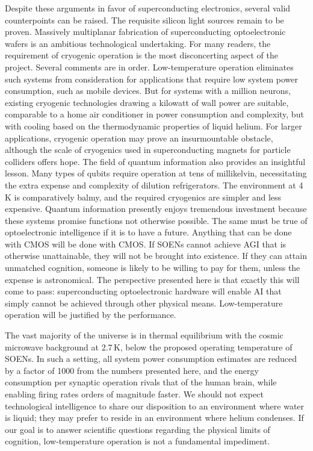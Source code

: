 \documentclass[twocolumn]{article}
\begin{document}
Despite these arguments in favor of superconducting electronics, several valid counterpoints can be raised. The requisite silicon light sources remain to be proven. Massively multiplanar fabrication of superconducting optoelectronic wafers is an ambitious technological undertaking. For many readers, the requirement of cryogenic operation is the most disconcerting aspect of the project. Several comments are in order. Low-temperature operation eliminates such systems from consideration for applications that require low system power consumption, such as mobile devices. But for systems with a million neurons, existing cryogenic technologies drawing a kilowatt of wall power are suitable, comparable to a home air conditioner in power consumption and complexity, but with cooling based on the thermodynamic properties of liquid helium. For larger applications, cryogenic operation may prove an insurmountable obstacle, although the scale of cryogenics used in superconducting magnets for particle colliders offers hope. The field of quantum information also provides an insightful lesson. Many types of qubits require operation at tens of millikelvin, necessitating the extra expense and complexity of dilution refrigerators. The environment at 4\,K is comparatively balmy, and the required cryogenics are simpler and less expensive. Quantum information presently enjoys tremendous investment because these systems promise functions not otherwise possible. The same must be true of optoelectronic intelligence if it is to have a future. Anything that can be done with CMOS will be done with CMOS. If SOENs cannot achieve AGI that is otherwise unattainable, they will not be brought into existence. If they can attain unmatched cognition, someone is likely to be willing to pay for them, unless the expense is astronomical. The perspective presented here is that exactly this will come to pass: superconducting optoelectronic hardware will enable AI that simply cannot be achieved through other physical means. Low-temperature operation will be justified by the performance.

The vast majority of the universe is in thermal equilibrium with the cosmic microwave background at 2.7\,K, below the proposed operating temperature of SOENs. In such a setting, all system power consumption estimates are reduced by a factor of 1000 from the numbers presented here, and the energy consumption per synaptic operation rivals that of the human brain, while enabling firing rates orders of magnitude faster. We should not expect technological intelligence to share our disposition to an environment where water is liquid; they may prefer to reside in an environment where helium condenses. If our goal is to answer scientific questions regarding the physical limits of cognition, low-temperature operation is not a fundamental impediment.
\end{document}
